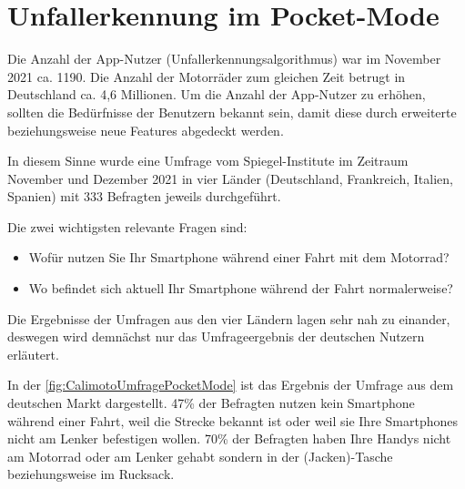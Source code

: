 \chapter{Unfallerkennung im Pocket-Mode}




Die Anzahl der App-Nutzer (Unfallerkennungsalgorithmus) war im November 2021 ca. 1190. Die Anzahl der Motorräder zum gleichen Zeit betrugt in Deutschland ca. 4,6 Millionen. Um die Anzahl der App-Nutzer zu erhöhen, sollten die Bedürfnisse der Benutzern bekannt sein, damit diese durch erweiterte beziehungsweise neue Features abgedeckt werden.

In diesem Sinne wurde eine Umfrage vom Spiegel-Institute im Zeitraum November und Dezember 2021 in vier Länder (Deutschland, Frankreich, Italien, Spanien) mit 333 Befragten jeweils durchgeführt.

Die zwei wichtigsten relevante Fragen sind:
\begin{itemize}
	\item Wofür nutzen Sie Ihr Smartphone während einer Fahrt mit dem Motorrad?
	\item Wo befindet sich aktuell Ihr Smartphone während der Fahrt normalerweise?
\end{itemize}

Die Ergebnisse der Umfragen aus den vier Ländern lagen sehr nah zu einander, deswegen wird demnächst nur das Umfrageergebnis der deutschen Nutzern erläutert.

In der \autoref{fig:CalimotoUmfragePocketMode} ist das Ergebnis der Umfrage aus dem deutschen Markt dargestellt. 47\% der Befragten nutzen kein Smartphone während einer Fahrt, weil die Strecke bekannt ist oder weil sie Ihre Smartphones nicht am Lenker befestigen wollen. 70\% der Befragten haben Ihre Handys nicht am Motorrad oder am Lenker gehabt sondern in der (Jacken)-Tasche beziehungsweise im Rucksack. 



